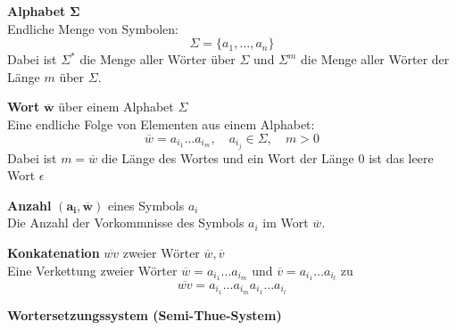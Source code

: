 
\begin{defi} \label{defi:Alphabet} \textbf{Alphabet} $\mathbf{\Sigma}$\\
Endliche Menge von Symbolen: 
\[\Sigma = \{a_1, \ldots, a_n\}\]
Dabei ist $\Sigma^*$ die Menge aller Wörter über $\Sigma$ und $\Sigma^m$ die Menge aller Wörter der Länge $m$ über $\Sigma$.
\end{defi}
\begin{defi} \label{defi:Wort} \textbf{Wort} $\mathbf{\overline{w}}$ über einem Alphabet $\Sigma$ \\
Eine endliche Folge von Elementen aus einem Alphabet: 
\[\overline{w} = a_{i_1}\ldots a_{i_m}, \quad a_{i_j} \in \Sigma, \quad m > 0\]
Dabei ist $m = \overline{w}$ die Länge des Wortes und ein Wort der Länge 0 ist das leere Wort \underline{$\epsilon$}
\end{defi}
\begin{defi} \label{defi:Anzahl} \textbf{Anzahl} $\mathbf{(a_i, \overline{w})}$ eines Symbols $a_i$ \\
Die Anzahl der Vorkommnisse des Symbols $a_i$ im
Wort $\overline{w}$.
\end{defi}
\begin{defi}\label{defi:Konkatenation} \textbf{Konkatenation} $\overline{wv}$ zweier Wörter $\overline{w}, \overline{v}$ \\
Eine Verkettung zweier Wörter $\overline{w} = a_{i_1}\ldots a_{i_m}$ und $\overline{v} = a_{i_1}\ldots a_{i_l}$ zu 
\[\overline{wv}=a_{i_1}\ldots a_{i_m}a_{i_1}\ldots a_{i_l}\]
\end{defi}
\begin{defi} \label{defi:Präfix} 

\end{defi}

\begin{defi} \label{defi:Wortersetzungssystem} \textbf{Wortersetzungssystem (Semi-Thue-System)}

\end{defi}
